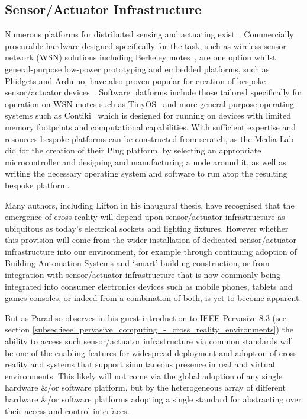 \subsection{Sensor/Actuator Infrastructure}
\label{subsec:sensor_actuator_infrastructure}
Numerous platforms for distributed sensing and actuating exist~\cite{Bose2009}. Commercially procurable hardware designed specifically for the task, such as wireless sensor network (WSN) solutions including Berkeley motes~\cite{Bose2009}, are one option whilst general-purpose low-power prototyping and embedded platforms, such as Phidgets and Arduino, have also proven popular for creation of bespoke sensor/actuator devices~\cite{Faludi2010}. Software platforms include those tailored specifically for operation on WSN motes such as TinyOS~\cite{TinyOSAlliance} and more general purpose operating systems such as Contiki~\cite{Dunkels} which is designed for running on devices with limited memory footprints and computational capabilities. With sufficient expertise and resources bespoke platforms can be constructed from scratch, as the Media Lab did for the creation of their Plug platform, by selecting an appropriate microcontroller and designing and manufacturing a node around it, as well as writing the necessary operating system and software to run atop the resulting bespoke platform.

Many authors, including Lifton in his inaugural thesis, have recognised that the emergence of cross reality will depend upon sensor/actuator infrastructure as ubiquitous as today's electrical sockets and lighting fixtures. However whether this provision will come from the wider installation of dedicated sensor/actuator infrastructure into our environment, for example through continuing adoption of Building Automation Systems and `smart' building construction, or from integration with sensor/actuator infrastructure that is now commonly being integrated into consumer electronics devices such as mobile phones, tablets and games consoles, or indeed from a combination of both, is yet to become apparent.

But as Paradiso observes in his guest introduction to IEEE Pervasive 8.3 (see section \ref{subsec:ieee_pervasive_computing_-_cross_reality_environments}) the ability to access such sensor/actuator infrastructure via common standards will be one of the enabling features for widespread deployment and adoption of cross reality and systems that support simultaneous presence in real and virtual environments. This likely will not come via the global adoption of any single hardware \&/or software platform, but by the heterogeneous array of different hardware \&/or software platforms adopting a single standard for abstracting over their access and control interfaces.

